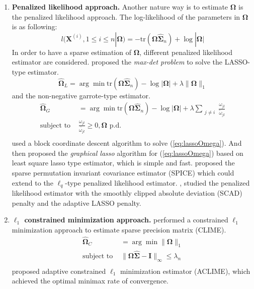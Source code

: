 \documentclass[11pt]{article}
\newcommand{\bX}{\mathbf X}
\newcommand{\bI}{\mathbf I}
\newcommand{\bOmega}{{\boldsymbol{\Omega}}}
\newcommand{\bSigma}{{\boldsymbol{\Sigma}}}
\begin{document}
\begin{enumerate}
	\item \textbf{Penalized likelihood approach.}
	Another nature way is to estimate $\bOmega$ is the penalized likelihood approach. The log-likelihood of the parameters in $\bOmega$ is as following:
	\begin{equation}
		\label{eq:mle}
		l(\bX^(i), 1 \leq i \leq n|\bOmega) = -\text{tr}(\bOmega \hat{\bSigma}_n) + \log|\bOmega|
	\end{equation}
	In order to have a sparse estimation of $\bOmega$, different penalized likelihood estimator are considered. \cite{yuan2007model} proposed the \emph{max-det problem} to solve the LASSO-type estimator.
	\begin{equation}
	\label{eq:lassoOmega}
	\hat{\bOmega}_L = \arg\min \text{tr}(\bOmega \hat{\bSigma}_n) - \log|\bOmega| + \lambda \|\bOmega\|_1
	\end{equation}
	and the non-negative garrote-type estimator. 
	\begin{equation}
	\label{eq:garroteOmega}
	\begin{aligned}
	 	\hat{\bOmega}_G &= \arg\min \text{tr}(\bOmega \hat{\bSigma}_n) - \log|\bOmega| + \lambda \sum_{\substack{j \neq i}} \frac{\omega_{jl}}{\tilde{\omega}_{jl}} \\
	 	\text{subject to }& \frac{\omega_{jl}}{\tilde{\omega_{jl}}} \geq 0, \bOmega \text{ p.d.}\\
	\end{aligned}
	\end{equation}
	\cite{banerjee2008model} used a block coordinate descent algorithm to solve (\ref{eq:lassoOmega}). And then \cite{friedman2008sparse} proposed the \emph{graphical lasso} algorithm for (\ref{eq:lassoOmega}) based on least square lasso type estimator, which is simple and fast. \cite{rothman2008sparse} proposed the sparse permutation invariant covariance estimator (SPICE) which could extend to the $\ell_q$-type penalized likelihood estimator. \cite{fan2009network}, \cite{lam2009sparsistency} studied the penalized likelihood estimator with the smoothly clipped absolute deviation (SCAD) penalty and the adaptive LASSO penalty.
	
	\item \textbf{$\ell_1$ constrained minimization approach.}
	\cite{cai2011constrained} performed a constrained $\ell_1$ minimization approach to estimate sparse precision matrix (CLIME). 
	\begin{equation}
	\label{eq:clime}
	\begin{aligned}
	\hat{\bOmega}_{C} &= \arg\min \|\bOmega\|_1 \\
	\text{subject to }& \|\bOmega \hat{\bSigma} - \bI \|_{\infty} \leq \lambda_n\\
	\end{aligned}
	\end{equation}
	\cite{cai2016estimating} proposed adaptive constrained $\ell_1$ minimization estimator (ACLIME), which achieved the optimal minimax rate of convergence. 
\end{enumerate}
  
\end{document}
